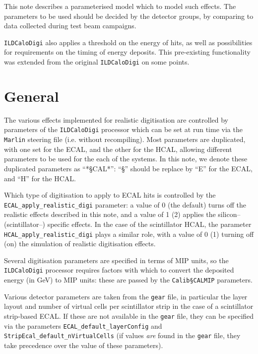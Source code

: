 \documentclass[12pt]{article} %
\begin{document}
This note describes a parameterised model which to model such effects. The parameters to be used should be decided by
the detector groups, by comparing to data collected during test beam campaigns.

{\tt ILDCaloDigi} also applies a threshold on the energy of hits, as well as possibilities for requirements on the timing
of energy deposits. This pre-existing functionality was extended from the original {\tt ILDCaloDigi} on some points.

\section{General}

The various effects implemented for realistic digitisation are controlled by parameters of the {\tt ILDCaloDigi}
processor which can be set at run time via the {\tt Marlin} steering file (i.e. without recompiling).
Most parameters are duplicated, with one set for the ECAL, and the other for the HCAL, allowing different
parameters to be used for the each of the systems. In this note, we denote these duplicated parameters as ``*\S CAL*'':
``\S'' should be replace by ``E'' for the ECAL, and ``H'' for the HCAL.

Which type of digitisation to apply to ECAL hits is controlled by the {\tt ECAL\_apply\_realistic\_digi} parameter: a value of
0 (the default) turns off the realistic effects described in this note, and a value of 1 (2) applies the silicon--
(scintillator--) specific effects.
In the case of the scintillator HCAL, the parameter {\tt HCAL\_apply\_realistic\_digi}
plays a similar role, with a value of 0 (1) turning off (on) the simulation of realistic digitisation effects.

Several digitisation parameters are specified in terms of MIP units, so the {\tt ILDCaloDigi} processor requires
factors with which to convert the deposited energy (in GeV) to MIP units: these are passed by the {\tt Calib\S CALMIP} parameters.

Various detector parameters are taken from the {\tt gear} file, in particular the layer layout and number of virtual
cells per scintillator strip in the case of a scintillator strip-based ECAL.
If these are not available in the {\tt gear} file, they can be specified via the
parameters {\tt ECAL\_default\_layerConfig} and {\tt StripEcal\_default\_nVirtualCells} (if values {\em are} found in the
{\tt gear} file, they take precedence over the value of these parameters).
\end{document}

